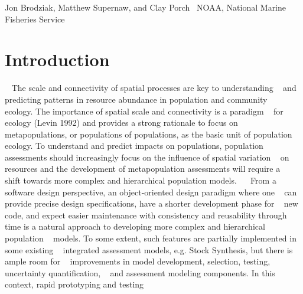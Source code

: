 Jon Brodziak, Matthew Supernaw, and Clay Porch~\newline
 N\+O\+A\+A, National Marine Fisheries Service~\newline
\hypertarget{index_Introduction}{}\section{Introduction}\label{index_Introduction}
~\newline
 The scale and connectivity of spatial processes are key to understanding ~\newline
 and predicting patterns in resource abundance in population and community ~\newline
 ecology. The importance of spatial scale and connectivity is a paradigm ~\newline
 for ecology (Levin 1992) and provides a strong rationale to focus on ~\newline
 metapopulations, or populations of populations, as the basic unit of population ~\newline
 ecology. To understand and predict impacts on populations, population ~\newline
 assessments should increasingly focus on the influence of spatial variation ~\newline
 on resources and the development of metapopulation assessments will require a ~\newline
 shift towards more complex and hierarchical population models.~\newline
 ~\newline
 From a software design perspective, an object-\/oriented design paradigm where one ~\newline
 can provide precise design specifications, have a shorter development phase for ~\newline
 new code, and expect easier maintenance with consistency and reusability through ~\newline
 time is a natural approach to developing more complex and hierarchical population ~\newline
 models. To some extent, such features are partially implemented in some existing ~\newline
 integrated assessment models, e.\+g. Stock Synthesis, but there is ample room for ~\newline
 improvements in model development, selection, testing, uncertainty quantification, ~\newline
 and assessment modeling components. In this context, rapid prototyping and testing ~\newline
